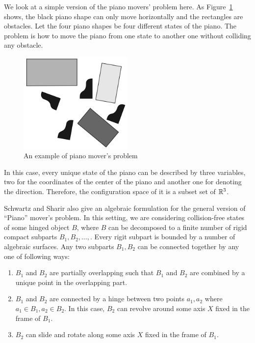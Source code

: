 \begin{example}
  We look at a simple version of the piano movers' problem here.
  As Figure~\ref{fig:piano} shows, the black piano shape can only move horizontally and the rectangles are obstacles.
  Let the four piano shapes be four different states of the piano.
  The problem is how to move the piano from one state to another one without colliding any obstacle.
  \begin{figure}
    \begin{center}
      \includegraphics[width=0.5\textwidth]{fig-piano}
    \end{center}
    \caption{An example of piano mover's problem}
    \label{fig:piano}
  \end{figure}
\end{example}
In this case, every unique state of the piano can be described by three variables, two for the coordinates of the center of the piano and another one for denoting the direction.
Therefore, the configuration space of it is a subset set of \(\mathbb{R}^3\).

Schwartz and Sharir also give an algebraic formulation for the general version of ``Piano'' mover's problem.
In this setting, we are considering collision-free states of some hinged object \(B\), where \(B\) can be decomposed to a finite number of rigid compact subparts \(B_1,B_2,\dots,\).
Every rigit subpart is bounded by a number of algebraic surfaces.
Any two subparts \(B_1, B_2\) can be connected together by any one of following ways:
\begin{enumerate}[label=\arabic*)]
\item \(B_1\) and \(B_2\) are partially overlapping such that \(B_1\) and \(B_2\) are combined by a unique point in the overlapping part.
\item \(B_1\) and \(B_2\) are connected by a hinge between two points \(a_1, a_2\) where \(a_1\in B_1, a_2\in B_2\). In this case, \(B_2\) can revolve around some axis \(X\) fixed in the frame of \(B_1\).
\item \(B_2\) can slide and rotate along some axis \(X\) fixed in the frame of \(B_1\).
\end{enumerate}

